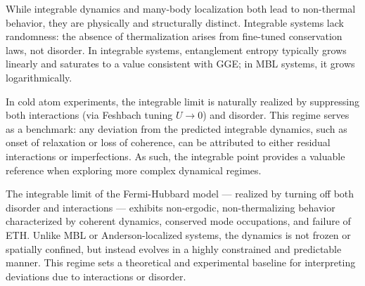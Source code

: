 While integrable dynamics and many-body localization both lead to non-thermal behavior, they are physically and structurally distinct. Integrable systems lack randomness: the absence of thermalization arises from fine-tuned conservation laws, not disorder. In integrable systems, entanglement entropy typically grows linearly and saturates to a value consistent with GGE; in MBL systems, it grows logarithmically. 

In cold atom experiments, the integrable limit is naturally realized by suppressing both interactions (via Feshbach tuning $U \to 0$) and disorder. This regime serves as a benchmark: any deviation from the predicted integrable dynamics, such as onset of relaxation or loss of coherence, can be attributed to either residual interactions or imperfections. As such, the integrable point provides a valuable reference when exploring more complex dynamical regimes.

The integrable limit of the Fermi-Hubbard model — realized by turning off both disorder and interactions — exhibits non-ergodic, non-thermalizing behavior characterized by coherent dynamics, conserved mode occupations, and failure of ETH. Unlike MBL or Anderson-localized systems, the dynamics is not frozen or spatially confined, but instead evolves in a highly constrained and predictable manner. This regime sets a theoretical and experimental baseline for interpreting deviations due to interactions or disorder.



